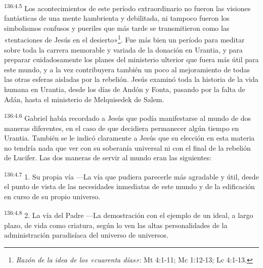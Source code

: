 \par
\textsuperscript{136:4.5} Los acontecimientos de este período extraordinario no fueron las visiones fantásticas de una mente hambrienta y debilitada, ni tampoco fueron los simbolismos confusos y pueriles que más tarde se transmitieron como las «tentaciones de Jesús en el desierto»\footnote{\textit{Razón de la idea de los «cuarenta días»}: Mt 4:1-11; Mc 1:12-13; Lc 4:1-13.}. Fue más bien un período para meditar sobre toda la carrera memorable y variada de la donación en Urantia, y para preparar cuidadosamente los planes del ministerio ulterior que fuera más útil para este mundo, y a la vez contribuyera también un poco al mejoramiento de todas las otras esferas aisladas por la rebelión. Jesús examinó toda la historia de la vida humana en Urantia, desde los días de Andón y Fonta, pasando por la falta de Adán, hasta el ministerio de Melquisedek de Salem.

\par
\textsuperscript{136:4.6} Gabriel había recordado a Jesús que podía manifestarse al mundo de dos maneras diferentes, en el caso de que decidiera permanecer algún tiempo en Urantia. También se le indicó claramente a Jesús que su elección en esta materia no tendría nada que ver con su soberanía universal ni con el final de la rebelión de Lucifer. Las dos maneras de servir al mundo eran las siguientes:

\par
\textsuperscript{136:4.7} 1. Su propia vía ---La vía que pudiera parecerle más agradable y útil, desde el punto de vista de las necesidades inmediatas de este mundo y de la edificación en curso de su propio universo.

\par
\textsuperscript{136:4.8} 2. La vía del Padre ---La demostración con el ejemplo de un ideal, a largo plazo, de vida como criatura, según lo ven las altas personalidades de la administración paradisíaca del universo de universos.

